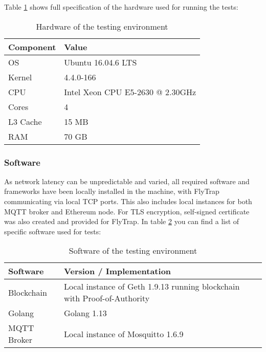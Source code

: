 Table \ref{tab:hw} shows full specification of the hardware used for running the tests:
\begin{table}[]
\centering
\begin{tabular}{|l|l|}
\hline
\textbf{Component} & \textbf{Value}                   \\ \hline
OS                 & Ubuntu 16.04.6 LTS               \\ \hline
Kernel             & 4.4.0-166                        \\ \hline
CPU                & Intel Xeon CPU E5-2630 @ 2.30GHz \\ \hline
Cores              & 4                                \\ \hline
L3 Cache           & 15 MB                            \\ \hline
RAM                & 70 GB                            \\ \hline
\end{tabular}
\caption{Hardware of the testing environment}
\label{tab:hw}
\end{table}
\subsubsection{Software}
As network latency can be unpredictable and varied, all required software and frameworks have been locally installed in the machine, with FlyTrap communicating via local TCP ports. This also includes local instances for both MQTT broker and Ethereum node. For TLS encryption, self-signed certificate was also created and provided for FlyTrap. In table \ref{tab:sw} you can find a list of specific software used for tests:

\begin{table}[]
\centering
\begin{tabular}{|l|l|}
\hline
\textbf{Software} & \textbf{Version / Implementation}                                        \\ \hline
Blockchain        & Local instance of Geth 1.9.13 running blockchain with Proof-of-Authority \\ \hline
Golang            & Golang 1.13                                                              \\ \hline
MQTT Broker       & Local instance of Mosquitto 1.6.9                                        \\ \hline
\end{tabular}
\caption{Software of the testing environment}
\label{tab:sw}
\end{table}

